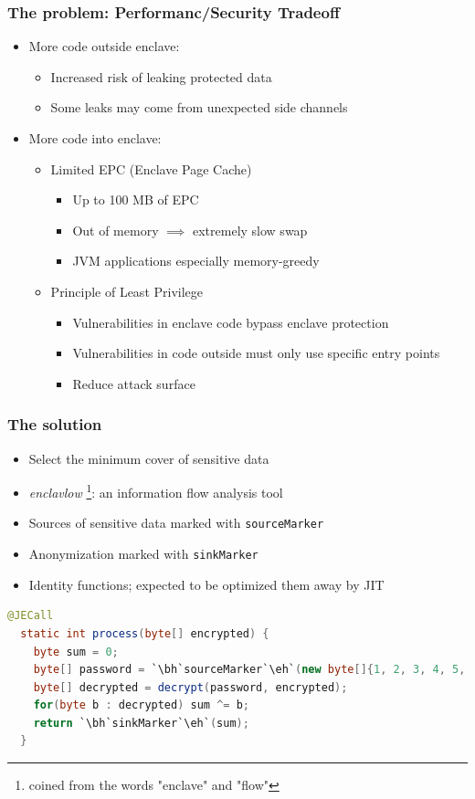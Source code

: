\documentclass{beamer}
\newcommand{\code}[1]{\colorbox{code}{\texttt{\footnotesize #1}}}
\newcounter{highlight}[page]
\newcommand{\tikzhighlightanchor}[1]{\ensuremath{\vcenter{\hbox{\tikz[remember picture, overlay]{\coordinate (#1 highlight \arabic{highlight});}}}}}
\newcommand{\bh}[0]{\stepcounter{highlight}\tikzhighlightanchor{begin}}
\newcommand{\eh}[0]{\tikzhighlightanchor{end}}
\begin{document}
\begin{frame}[t]
  \frametitle{The problem: Performanc/Security Tradeoff}
  \begin{itemize}
    \item More code outside enclave:
      \begin{itemize}
        \item Increased risk of leaking protected data
        \item Some leaks may come from unexpected side channels
      \end{itemize}
    \item More code into enclave:
      \begin{itemize}
        \item Limited EPC (Enclave Page Cache)
          \begin{itemize}
            \item Up to 100 MB of EPC
            \item Out of memory $\implies$ extremely slow swap
            \item JVM applications especially memory-greedy
          \end{itemize}
        \item Principle of Least Privilege
          \begin{itemize}
            \item Vulnerabilities in enclave code bypass enclave protection
            \item Vulnerabilities in code outside must only use specific entry points
            \item Reduce attack surface
          \end{itemize}
      \end{itemize}
  \end{itemize}
\end{frame}

\begin{frame}[fragile]
  \frametitle{The solution}
  \begin{itemize}
    \item Select the minimum cover of sensitive data
    \item \textit{enclavlow} \footnote{coined from the words "enclave" and "flow"}:
      an information flow analysis tool
    \item Sources of sensitive data marked with \code{sourceMarker}
    \item Anonymization marked with \code{sinkMarker}
    \item Identity functions; expected to be optimized them away by JIT
  \end{itemize}

  \begin{lstlisting}[style=j, language=java]
  @JECall
  static int process(byte[] encrypted) {
    byte sum = 0;
    byte[] password = `\bh`sourceMarker`\eh`(new byte[]{1, 2, 3, 4, 5, 6});
    byte[] decrypted = decrypt(password, encrypted);
    for(byte b : decrypted) sum ^= b;
    return `\bh`sinkMarker`\eh`(sum);
  }
  \end{lstlisting}
\end{frame}
\end{document}

